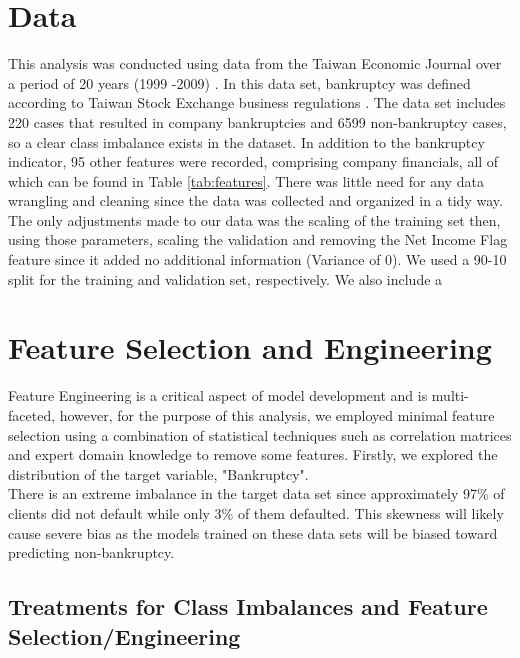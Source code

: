 \documentclass[12pt]{report}
\begin{document}
\section{Data}
This analysis was conducted using data from the Taiwan Economic Journal over a period of 20 years (1999 -2009) \cite{Data}. In this data set, bankruptcy was defined according to Taiwan Stock Exchange business regulations \cite{TSE}. The data set includes 220 cases that resulted in company bankruptcies and 6599 non-bankruptcy cases, so a clear class imbalance exists in the dataset. In addition to the bankruptcy indicator, 95 other features were recorded, comprising company financials, all of which can be found in Table \ref{tab:features}. There was little need for any data wrangling and cleaning since the data was collected and organized in a tidy way. The only adjustments made to our data was the scaling of the training set then, using those parameters, scaling the validation and removing the Net Income Flag feature since it added no additional information (Variance of 0). We used a 90-10 split for the training and validation set, respectively. We also include a 

\section{Feature Selection and Engineering} 

Feature Engineering is a critical aspect of model development and is multi-faceted, however, for the purpose of this analysis, we employed minimal feature selection using a combination of statistical techniques such as correlation matrices and expert domain knowledge to remove some features. Firstly, we explored the distribution of the target variable, "Bankruptcy". \\%
\indent There is an extreme imbalance in the target data set since approximately 97\% of clients did not default while only 3\% of them defaulted. This skewness will likely cause severe bias as the models trained on these data sets will be biased toward predicting non-bankruptcy.
\subsection{Treatments for Class Imbalances and Feature Selection/Engineering}
\end{document}
